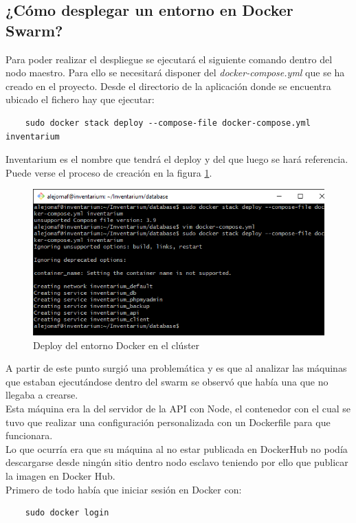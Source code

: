 \subsection{¿Cómo desplegar un entorno en Docker Swarm?}
Para poder realizar el despliegue se ejecutará el siguiente comando dentro del nodo maestro. Para ello se necesitará disponer del \textit{docker-compose.yml} que se ha creado en el proyecto. Desde el directorio de la aplicación donde se encuentra ubicado el fichero hay que ejecutar:
\begin{verbatim}
    sudo docker stack deploy --compose-file docker-compose.yml inventarium
\end{verbatim}
Inventarium es el nombre que tendrá el deploy y del que luego se hará referencia. Puede verse el proceso de creación en la figura \ref{fig:docker-stack-deploy}.
\begin{figure}
    \centering
    \includegraphics[scale=0.5, keepaspectratio]{imagenes/complemento/docker-swarm/docker-stack-deploy.png}
    \caption{Deploy del entorno Docker en el clúster}\label{fig:docker-stack-deploy}
\end{figure}
A partir de este punto surgió una problemática y es que al analizar las máquinas que estaban ejecutándose dentro del swarm se observó que había una que no llegaba a crearse.
\\Esta máquina era la del servidor de la API con Node, el contenedor con el cual se tuvo que realizar una configuración personalizada con un Dockerfile para que funcionara.
\\Lo que ocurría era que su máquina al no estar publicada en DockerHub no podía descargarse desde ningún sitio dentro nodo esclavo teniendo por ello que publicar la imagen en Docker Hub.
\\Primero de todo había que iniciar sesión en Docker con:
\begin{verbatim}
    sudo docker login
\end{verbatim}
